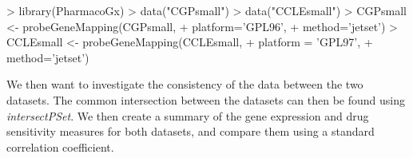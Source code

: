 \documentclass[11pt]{article}
\begin{document}
\begin{Schunk}
\begin{Sinput}
>   library(PharmacoGx)
>   data("CGPsmall")
>   data("CCLEsmall")
>   CGPsmall <- probeGeneMapping(CGPsmall, 
+                                platform='GPL96', 
+                                method='jetset')
>   CCLEsmall <- probeGeneMapping(CCLEsmall, 
+                                 platform = 'GPL97', 
+                                 method='jetset')
\end{Sinput}
\end{Schunk}
We then want to investigate the consistency of the data between the two datasets. The common intersection between the datasets can then be found using \textit{intersectPSet}. We then create a summary of the gene expression and drug sensitivity measures for both datasets, and compare them using a standard correlation coefficient. 
\end{document}
